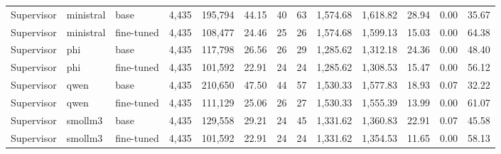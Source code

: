 \begin{table}[t]
\begin{tabular}{lllrrrrrrrrrr}
Supervisor & ministral & base & 4,435 & 195,794 & 44.15 & 40 & 63 & 1,574.68 & 1,618.82 & 28.94 & 0.00 & 35.67 \\
Supervisor & ministral & fine-tuned & 4,435 & 108,477 & 24.46 & 25 & 26 & 1,574.68 & 1,599.13 & 15.03 & 0.00 & 64.38 \\
Supervisor & phi & base & 4,435 & 117,798 & 26.56 & 26 & 29 & 1,285.62 & 1,312.18 & 24.36 & 0.00 & 48.40 \\
Supervisor & phi & fine-tuned & 4,435 & 101,592 & 22.91 & 24 & 24 & 1,285.62 & 1,308.53 & 15.47 & 0.00 & 56.12 \\
Supervisor & qwen & base & 4,435 & 210,650 & 47.50 & 44 & 57 & 1,530.33 & 1,577.83 & 18.93 & 0.07 & 32.22 \\
Supervisor & qwen & fine-tuned & 4,435 & 111,129 & 25.06 & 26 & 27 & 1,530.33 & 1,555.39 & 13.99 & 0.00 & 61.07 \\
Supervisor & smollm3 & base & 4,435 & 129,558 & 29.21 & 24 & 45 & 1,331.62 & 1,360.83 & 22.91 & 0.07 & 45.58 \\
Supervisor & smollm3 & fine-tuned & 4,435 & 101,592 & 22.91 & 24 & 24 & 1,331.62 & 1,354.53 & 11.65 & 0.00 & 58.13 \\
\bottomrule
\end{tabular}
\end{table}
